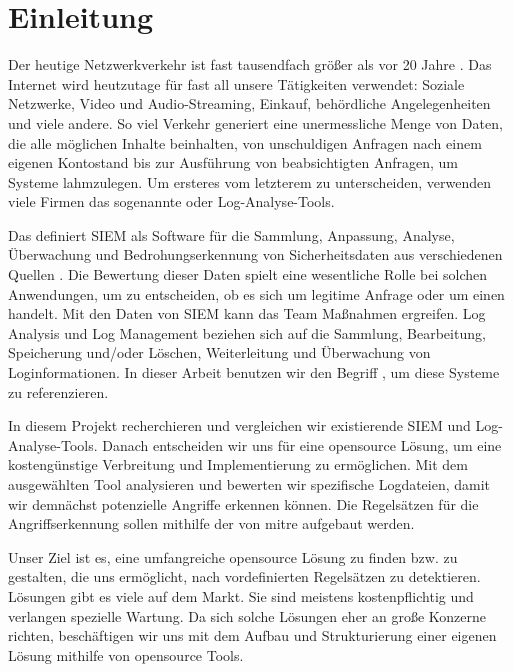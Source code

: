 \section{Einleitung}

Der heutige Netzwerkverkehr ist fast tausendfach größer als vor 20 Jahre \citep{Roser_I}. Das Internet wird heutzutage für fast all unsere Tätigkeiten verwendet: Soziale Netzwerke, Video und Audio-Streaming, Einkauf, behördliche Angelegenheiten und viele andere. So viel Verkehr generiert eine unermessliche Menge von Daten, die alle möglichen Inhalte beinhalten, von unschuldigen Anfragen nach einem eigenen Kontostand bis zur Ausführung von beabsichtigten Anfragen, um Systeme lahmzulegen. Um ersteres vom letzterem zu unterscheiden, verwenden viele Firmen das sogenannte  oder Log-Analyse-Tools. 

Das  definiert \gls{SIEM} als Software für die Sammlung, Anpassung, Analyse, Überwachung und Bedrohungserkennung von Sicherheitsdaten aus verschiedenen Quellen \citep{NIST_Definitions}. Die Bewertung dieser Daten spielt eine wesentliche Rolle bei solchen Anwendungen, um zu entscheiden, ob es sich um legitime Anfrage oder um einen  handelt. Mit den Daten von \gls{SIEM} kann das  Team Maßnahmen ergreifen. Log Analysis und Log Management beziehen sich auf die Sammlung, Bearbeitung, Speicherung und/oder Löschen, Weiterleitung und Überwachung von Loginformationen. In dieser Arbeit benutzen wir den Begriff , um diese Systeme zu referenzieren.

In diesem Projekt recherchieren und vergleichen wir existierende \gls{SIEM} und Log-Analyse-Tools. Danach entscheiden wir uns für eine \gls{opensource} Lösung, um eine kostengünstige Verbreitung und Implementierung zu ermöglichen. Mit dem ausgewählten Tool analysieren und bewerten wir spezifische Logdateien, damit wir demnächst potenzielle Angriffe erkennen können. Die Regelsätzen für die Angriffserkennung sollen mithilfe der  von \gls{mitre} aufgebaut werden.

\newpage
Unser Ziel ist es, eine umfangreiche \gls{opensource} Lösung zu finden bzw. zu gestalten, die uns ermöglicht,  nach vordefinierten Regelsätzen zu detektieren.  Lösungen gibt es viele auf dem Markt. Sie sind meistens kostenpflichtig und verlangen spezielle Wartung. Da sich solche Lösungen eher an große Konzerne richten, beschäftigen wir uns mit dem Aufbau und Strukturierung einer eigenen Lösung mithilfe von \gls{opensource} Tools. 

